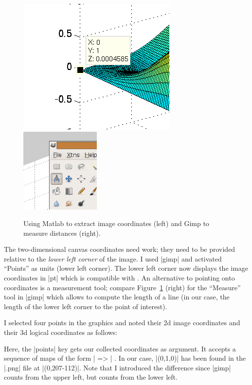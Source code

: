 {{\begin{figure}
        \includegraphics{plotdata/plotgraphics3dsurfmatlab.png}%
        \hfill
        \includegraphics[width=4cm]{plotdata/plotgraphics_gimpmeasure.png}%
        \hfill
    \caption{Using Matlab to extract image coordinates (left) and Gimp to
             measure distances (right).}
        \label{fig:plotgraphics3d}
\end{figure}


The two-dimensional canvas coordinates need work; they need to be provided
relative to the \emph{lower left corner} of the image. I used |gimp| and
activated ``Points'' as units (lower left corner). The lower left corner now
displays the image coordinates in |pt| which is compatible with \PGFPlots{}. An
alternative to pointing onto coordinates is a measurement tool; compare
Figure~\ref{fig:plotgraphics3d} (right) for the ``Measure'' tool in |gimp|
which allows to compute the length of a line (in our case, the length of the
lower left corner to the point of interest).

I selected four points in the graphics and noted their 2d image coordinates and
their 3d logical coordinates as follows:
%
\begin{codeexample}[]
\end{codeexample}
%
Here, the |points| key gets our collected coordinates as argument. It accepts a
sequence of maps of the form  | => | . In our case, |(0,1,0)| has been found in the |.png| file at
|(0,207-112)|. Note that I introduced the difference since |gimp| counts from
the upper left, but \PGFPlots{} counts from the lower left.

}}
